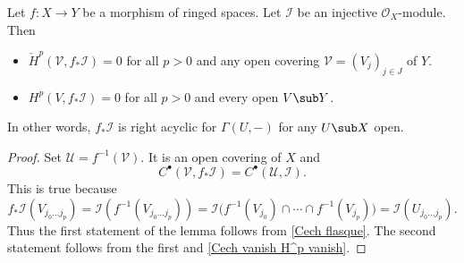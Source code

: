 \begin{proposition}\label{push injective}
Let $f:X\to Y$ be a morphism of ringed spaces. Let $\mathscr{I}$ be an injective $\mathscr{O}_X$-module. Then
\begin{itemize}
\item $\check{H}^p(\mathcal{V},f_*\mathscr{I})=0$ for all $p>0$ and any open covering $\mathcal{V}=(V_j)_{j\in J}$ of $Y$.
\item $H^p(V,f_*\mathscr{I})=0$ for all $p>0$ and every open $V\sub Y$.
\end{itemize}
In other words, $f_*\mathscr{I}$ is right acyclic for $\Gamma(U,-)$ for any $U\sub X$ open.
\end{proposition}
\begin{proof}
Set $\mathcal{U}=f^{-1}(\mathcal{V})$. It is an open covering of $X$ and
\[C^\bullet(\mathcal{V},f_*\mathscr{I})=C^\bullet(\mathcal{U},\mathscr{I}).\]
This is true because
\[f_*\mathscr{I}(V_{j_0\dots j_p})=\mathscr{I}(f^{-1}(V_{j_0\dots j_p}))=\mathscr{I}\big(f^{-1}(V_{j_0})\cap\cdots\cap f^{-1}(V_{j_p})\big)=\mathscr{I}(U_{j_0\dots j_p}).\]
Thus the first statement of the lemma follows from \cref{Cech flasque}. The second statement follows from the first and \cref{Cech vanish H^p vanish}.
\end{proof}